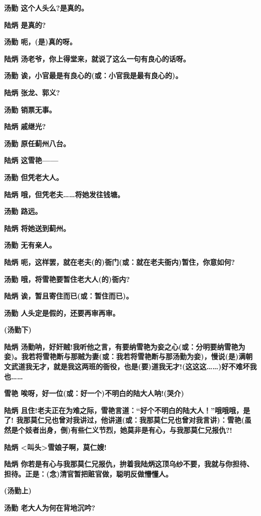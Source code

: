 \textbf{汤勤 这个人头么?是真的。}

\textbf{陆炳 是真的?}

\textbf{汤勤 呃，(是)真的呀。}

\textbf{陆炳 汤老爷，你上得堂来，就说了这么一句有良心的话呀。}

\textbf{汤勤 诶，小官最是有良心的(或：小官我是最有良心的)。}

\textbf{陆炳 张龙、郭义?}

\textbf{汤勤 销票无事。}

\textbf{陆炳 戚继光?}

\textbf{汤勤 原任蓟州八台。}

\textbf{陆炳 这雪艳------}

\textbf{汤勤 但凭老大人。}

\textbf{陆炳 哦，但凭老夫\ldots{}\ldots{}将她发往钱塘。}

\textbf{汤勤 路远。}

\textbf{陆炳 将她送到蓟州。}

\textbf{汤勤 无有亲人。}

\textbf{陆炳
呃，这样罢，就在老夫(的)衙门(或：就在老夫衙内)暂住，你意如何?}

\textbf{汤勤 哦，将雪艳要暂住老大人(的)衙内?}

\textbf{陆炳 诶，暂且寄住而已(或：暂住而已)。}

\textbf{汤勤 人头定是假的，还要再审再审。}

\textbf{(汤勤下)}

\textbf{陆炳
汤勤呐，好奸贼!我听他之言，有要纳雪艳为妾之心(或：分明要纳雪艳为妾)。我若将雪艳断与那贼为妻(或：我若将雪艳断与那汤勤为妾)，慢说(是)满朝文武道我无才，就是我这两班的衙役，也是(要)道我无才!(这这这\ldots{}\ldots{})好不难坏我也\ldots{}\ldots{}}

\textbf{雪艳 唉呀，好一位(或：好一个)不明白的陆大人呐!(哭介)}

\textbf{陆炳
且住!老夫正在为难之际，雪艳言道：``好个不明白的陆大人！''哦哦哦，是了!
我那莫仁兄也曾对我讲过，他讲道(或：我那莫仁兄也曾对我言讲)：雪艳(虽然是个妓者出身，倒)有些仁义节烈，她莫非是有心，与我那莫仁兄报仇?!}

\textbf{陆炳 \textless{}叫头\textgreater{}雪娘子啊，莫仁嫂!}

\textbf{陆炳
你若是有心与我那莫仁兄报仇，拚着我陆炳这顶乌纱不要，我就与你担待、担待。正是：(念)清官暂把赃官做，聪明反做懵懂人。}

\textbf{(汤勤上)}

\textbf{汤勤 老大人为何在背地沉吟?}

